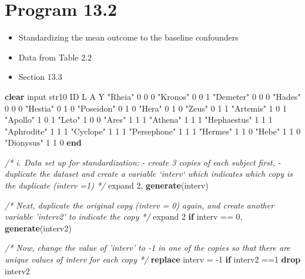 \documentclass[
  10pt,
]{book}
\newenvironment{Shaded}{\begin{snugshade}}{\end{snugshade}}
\newcommand{\CommentTok}[1]{\textcolor[rgb]{0.56,0.35,0.01}{\textit{#1}}}
\newcommand{\KeywordTok}[1]{\textcolor[rgb]{0.13,0.29,0.53}{\textbf{#1}}}
\newcommand{\NormalTok}[1]{#1}
\newcommand{\StringTok}[1]{\textcolor[rgb]{0.31,0.60,0.02}{#1}}
\providecommand{\tightlist}{%
  \setlength{\itemsep}{0pt}\setlength{\parskip}{0pt}}
\begin{document}
\hypertarget{program-13.2}{%
\section{Program 13.2}\label{program-13.2}}

\begin{itemize}
\tightlist
\item
  Standardizing the mean outcome to the baseline confounders
\item
  Data from Table 2.2
\item
  Section 13.3
\end{itemize}

\begin{Shaded}
\begin{Highlighting}[]
\KeywordTok{clear}
\NormalTok{input str10 ID L A Y}
\StringTok{"Rheia"}\NormalTok{ 	0 0 0 }
\StringTok{"Kronos"}\NormalTok{ 	0 0 1 }
\StringTok{"Demeter"}\NormalTok{ 	0 0 0 }
\StringTok{"Hades"}\NormalTok{ 	0 0 0 }
\StringTok{"Hestia"}\NormalTok{ 	0 1 0 }
\StringTok{"Poseidon"}\NormalTok{ 	0 1 0 }
\StringTok{"Hera"}\NormalTok{  	0 1 0 }
\StringTok{"Zeus"}\NormalTok{ 		0 1 1 }
\StringTok{"Artemis"}\NormalTok{ 	1 0 1}
\StringTok{"Apollo"}\NormalTok{	1 0 1}
\StringTok{"Leto"}\NormalTok{		1 0 0}
\StringTok{"Ares"}\NormalTok{		1 1 1}
\StringTok{"Athena"}\NormalTok{	1 1 1}
\StringTok{"Hephaestus"}\NormalTok{ 1 1 1}
\StringTok{"Aphrodite"}\NormalTok{ 1 1 1}
\StringTok{"Cyclope"}\NormalTok{	1 1 1}
\StringTok{"Persephone"}\NormalTok{ 1 1 1}
\StringTok{"Hermes"}\NormalTok{	1 1 0}
\StringTok{"Hebe"}\NormalTok{		1 1 0}
\StringTok{"Dionysus"}\NormalTok{	1 1	0 }
\KeywordTok{end}

\CommentTok{/* i. Data set up for standardization: }
\CommentTok{ - create 3 copies of each subject first, }
\CommentTok{ - duplicate the dataset and create a variable `interv` which indicates}
\CommentTok{which copy is the duplicate (interv =1) */}
\NormalTok{expand 2, }\KeywordTok{generate}\NormalTok{(interv)}

\CommentTok{/* Next, duplicate the original copy (interv = 0) again, and create}
\CommentTok{another variable 'interv2' to indicate the copy */}
\NormalTok{expand 2 }\KeywordTok{if}\NormalTok{ interv == 0, }\KeywordTok{generate}\NormalTok{(interv2)}

\CommentTok{/* Now, change the value of 'interv' to -1 in one of the copies so that}
\CommentTok{there are unique values of interv for each copy */}
\KeywordTok{replace}\NormalTok{ interv = -1  }\KeywordTok{if}\NormalTok{ interv2 ==1}
\KeywordTok{drop}\NormalTok{ interv2}


\end{Highlighting}
\end{Shaded}
\end{document}
